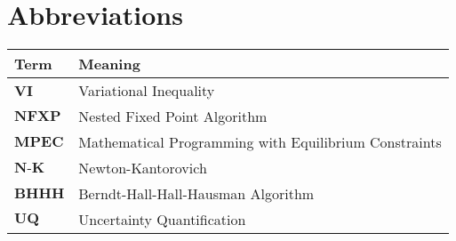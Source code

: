 

\section*{Abbreviations} %
\thispagestyle{plain} %

\phantom{This text will be invisible}
\hspace{20cm}



\begin{table}[H]
	\centering
	\renewcommand{\arraystretch}{1.2}%
	\begin{tabular}{@{}ll@{}}
		\toprule\midrule
	Term\phantom{space}	& Meaning \\ \midrule
		$\textbf{VI}$	& Variational Inequality \\
		$\textbf{NFXP}$	& Nested Fixed Point Algorithm \\
		$\textbf{MPEC}$	& Mathematical Programming with Equilibrium Constraints \\
		$\textbf{N-K}$	& Newton-Kantorovich \\
		$\textbf{BHHH}$	& Berndt-Hall-Hall-Hausman Algorithm \\
		$\textbf{UQ}$   & Uncertainty Quantification \\
 \bottomrule
	\end{tabular}
\end{table}